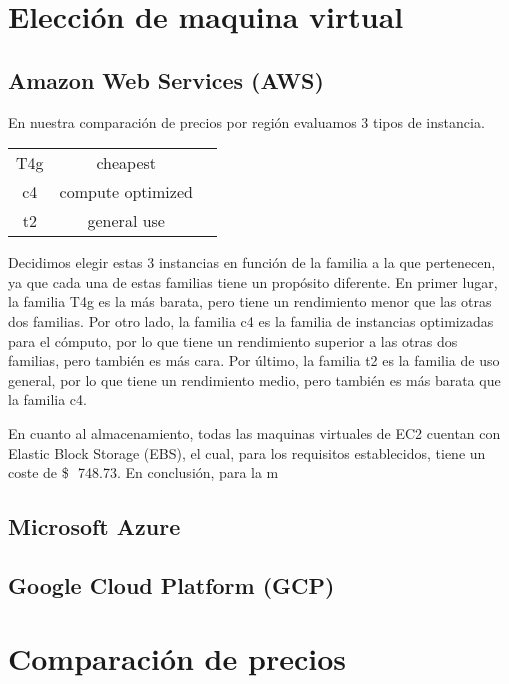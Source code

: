 \documentclass{article}
\newcommand{\usd}[1]{\SI{#1}[\$\ensuremath{\,}]{}}
\begin{document}
\section{Elección de maquina virtual}
  \subsection{Amazon Web Services (AWS)}

    En nuestra comparación de precios por región evaluamos 3 tipos de instancia.
      \begin{table}[!htp]\centering
        \begin{tabular}{|c|c|c|}

          T4g	& cheapest          \\
          c4	& compute optimized \\
          t2	& general use       \\
          
        \end{tabular}
      \end{table}
    Decidimos elegir estas 3 instancias en función de la familia a la que pertenecen, ya que cada una de estas familias tiene un propósito diferente.
    En primer lugar, la familia T4g es la más barata, pero tiene un rendimiento menor que las otras dos familias. Por otro lado, la familia c4 es la familia de instancias optimizadas para el cómputo, por lo que tiene un rendimiento superior a las otras dos familias, pero también es más cara. Por último, la familia t2 es la familia de uso general, por lo que tiene un rendimiento medio, pero también es más barata que la familia c4.

    En cuanto al almacenamiento, todas las maquinas virtuales de EC2 cuentan con Elastic Block Storage (EBS), el cual, para los requisitos establecidos, tiene un coste de \usd{748.73}.
    En conclusión, para la m

  \subsection{Microsoft Azure}
  \subsection{Google Cloud Platform (GCP)}

\section{Comparación de precios}
\end{document}

